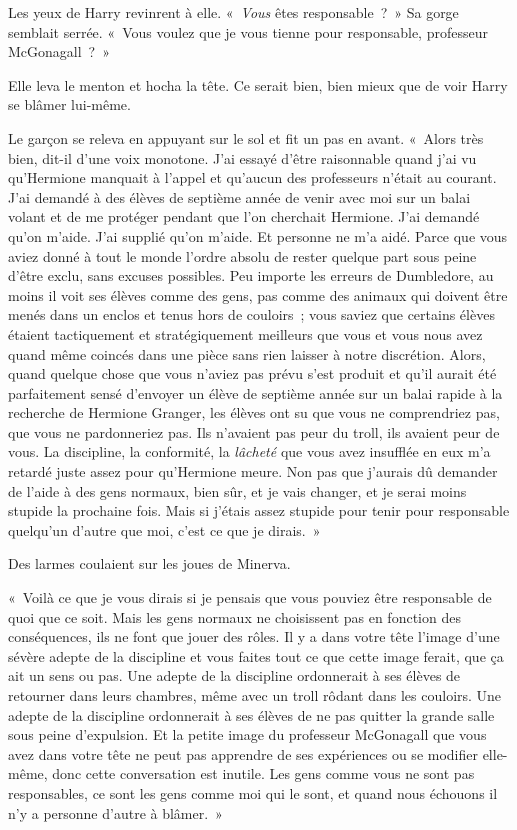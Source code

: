 Les yeux de Harry revinrent à elle. «~\emph{Vous} êtes responsable~?~» Sa gorge semblait serrée. «~Vous voulez que je vous tienne pour responsable, professeur McGonagall~?~»

Elle leva le menton et hocha la tête. Ce serait bien, bien mieux que de voir Harry se blâmer lui-même.

Le garçon se releva en appuyant sur le sol et fit un pas en avant. «~Alors très bien, dit-il d'une voix monotone. J'ai essayé d'être raisonnable quand j'ai vu qu'Hermione manquait à l'appel et qu'aucun des professeurs n'était au courant. J'ai demandé à des élèves de septième année de venir avec moi sur un balai volant et de me protéger pendant que l'on cherchait Hermione. J'ai demandé qu'on m'aide. J'ai supplié qu'on m'aide. Et personne ne m'a aidé. Parce que vous aviez donné à tout le monde l'ordre absolu de rester quelque part sous peine d'être exclu, sans excuses possibles. Peu importe les erreurs de Dumbledore, au moins il voit ses élèves comme des gens, pas comme des animaux qui doivent être menés dans un enclos et tenus hors de couloirs~; vous saviez que certains élèves étaient tactiquement et stratégiquement meilleurs que vous et vous nous avez quand même coincés dans une pièce sans rien laisser à notre discrétion. Alors, quand quelque chose que vous n'aviez pas prévu s'est produit et qu'il aurait été parfaitement sensé d'envoyer un élève de septième année sur un balai rapide à la recherche de Hermione Granger, les élèves ont su que vous ne comprendriez pas, que vous ne pardonneriez pas. Ils n'avaient pas peur du troll, ils avaient peur de vous. La discipline, la conformité, la \emph{lâcheté} que vous avez insufflée en eux m'a retardé juste assez pour qu'Hermione meure. Non pas que j'aurais dû demander de l'aide à des gens normaux, bien sûr, et je vais changer, et je serai moins stupide la prochaine fois. Mais si j'étais assez stupide pour tenir pour responsable quelqu'un d'autre que moi, c'est ce que je dirais.~»

Des larmes coulaient sur les joues de Minerva.

«~Voilà ce que je vous dirais si je pensais que vous pouviez être responsable de quoi que ce soit. Mais les gens normaux ne choisissent pas en fonction des conséquences, ils ne font que jouer des rôles. Il y a dans votre tête l'image d'une sévère adepte de la discipline et vous faites tout ce que cette image ferait, que ça ait un sens ou pas. Une adepte de la discipline ordonnerait à ses élèves de retourner dans leurs chambres, même avec un troll rôdant dans les couloirs. Une adepte de la discipline ordonnerait à ses élèves de ne pas quitter la grande salle sous peine d'expulsion. Et la petite image du professeur McGonagall que vous avez dans votre tête ne peut pas apprendre de ses expériences ou se modifier elle-même, donc cette conversation est inutile. Les gens comme vous ne sont pas responsables, ce sont les gens comme moi qui le sont, et quand nous échouons il n'y a personne d'autre à blâmer.~»


